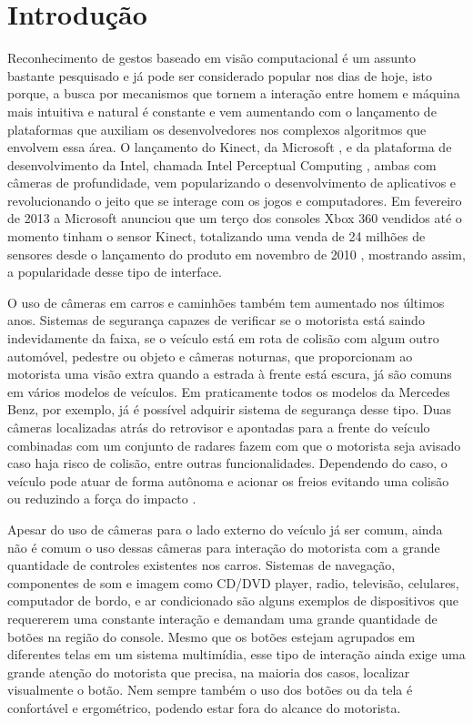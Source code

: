 \chapter{Introdução}

Reconhecimento de gestos baseado em visão computacional é um assunto bastante pesquisado e já pode ser considerado popular nos dias de hoje, isto porque, a busca por mecanismos que tornem a interação entre homem e máquina mais intuitiva e natural é constante e vem aumentando com o lançamento de plataformas que auxiliam os desenvolvedores nos complexos algoritmos que envolvem essa área.
O lançamento do Kinect, da Microsoft \cite{kinect}, e da plataforma de desenvolvimento da Intel, chamada Intel Perceptual Computing \cite{intel},  ambas com câmeras de profundidade, vem popularizando o desenvolvimento de aplicativos e revolucionando o jeito que se interage com os jogos e computadores. Em fevereiro de 2013 a Microsoft anunciou que um terço dos consoles Xbox 360 vendidos até o momento tinham o sensor Kinect, totalizando  uma venda de 24 milhões de sensores desde o lançamento do produto em novembro de 2010 \cite{kinect_sales}, mostrando assim, a popularidade desse tipo de interface.

O uso de câmeras em carros e caminhões também tem aumentado nos últimos anos. Sistemas de segurança capazes de verificar se o motorista está saindo indevidamente da faixa, se o veículo está em rota de colisão com algum outro automóvel, pedestre ou objeto e câmeras noturnas, que proporcionam ao motorista uma visão extra quando a  estrada à frente está escura, já são comuns em vários modelos de veículos. Em praticamente todos os modelos da Mercedes Benz, por exemplo, já é possível adquirir sistema de segurança desse tipo. Duas câmeras localizadas atrás do retrovisor e apontadas para a frente do veículo combinadas com um conjunto de radares fazem com que o motorista seja avisado caso haja risco de colisão, entre outras funcionalidades. Dependendo do caso, o veículo pode atuar de forma autônoma e acionar os freios evitando uma colisão ou reduzindo a força do impacto \cite{mercedes_youtube, mercedes_safety}. 

Apesar do uso de câmeras para o lado externo do veículo já ser comum, ainda não é comum o uso dessas câmeras para interação do motorista com a grande quantidade de controles existentes nos carros. Sistemas de navegação, componentes de som e imagem como CD/DVD player, radio, televisão, celulares, computador de bordo, e ar condicionado são alguns exemplos de dispositivos que requererem uma constante interação e demandam uma grande quantidade de botões na região do console. Mesmo que os botões estejam agrupados em diferentes telas em um sistema multimídia, esse tipo de interação ainda exige uma grande atenção do motorista que precisa, na maioria dos casos, localizar visualmente o botão. Nem sempre também o uso dos botões ou da tela é confortável e ergométrico, podendo estar fora do alcance do motorista.

